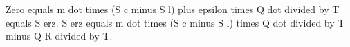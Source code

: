 Zero equals m dot times (S c minus S l) plus epsilon times Q dot divided by T equals S erz.  
S erz equals m dot times (S c minus S l) times Q dot divided by T minus Q R divided by T.